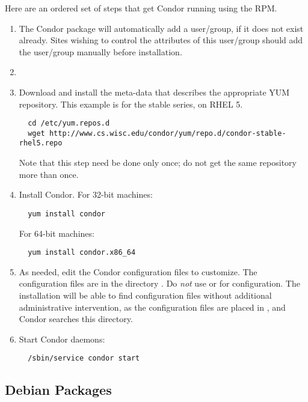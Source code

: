 Here are an ordered set of steps that get Condor running using the RPM.
\begin{enumerate}
\item The Condor package will automatically add a  user/group,
if it does not exist already.
Sites wishing to control the attributes of this user/group 
should add the  user/group manually before installation.

\item
\item Download and install the meta-data that describes 
the appropriate YUM repository. 
This example is for the stable series, on RHEL 5. 
\footnotesize
\begin{verbatim}
  cd /etc/yum.repos.d
  wget http://www.cs.wisc.edu/condor/yum/repo.d/condor-stable-rhel5.repo
\end{verbatim}
\normalsize
Note that this step need be done only once;
do not get the same repository more than once.

\item Install Condor.
For 32-bit machines:
\begin{verbatim}
  yum install condor
\end{verbatim}
For 64-bit machines:
\begin{verbatim}
  yum install condor.x86_64
\end{verbatim}

\item As needed, edit the Condor configuration files to customize.
The configuration files are in the directory  .
Do \emph{not} use  or  for configuration.
The installation will be able to find configuration files without
additional administrative intervention,
as the configuration files are placed in ,
and Condor searches this directory.

\item Start Condor daemons:
\begin{verbatim}
  /sbin/service condor start
\end{verbatim}

\end{enumerate}


\subsection{\label{sec:install-debs} Debian Packages}

